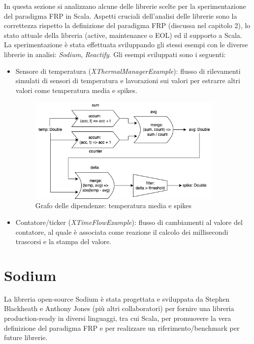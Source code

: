 \documentclass[../main.tex]{subfiles}
\begin{document}
In questa sezione si analizzano alcune delle librerie scelte per la sperimentazione del paradigma FRP in Scala. Aspetti cruciali dell'analisi delle librerie sono la correttezza rispetto la definizione del paradigma FRP (discussa nel capitolo 2), lo stato attuale della libreria (active, maintenance o EOL) ed il supporto a Scala. La sperimentazione è stata effettuata sviluppando gli stessi esempi con le diverse librerie in analisi: \textit{Sodium}, \textit{Reactify}. Gli esempi sviluppati sono i seguenti:
\begin{itemize}
    \item Sensore di temperatura (\textit{XThermalManagerExample}): flusso di rilevamenti simulati di sensori di temperatura e lavorazioni sui valori per estrarre altri valori come temperatura media e spikes.
    \begin{figure}[H]
        \centering
        \includegraphics[width=0.9\textwidth]{img/frp-scala-Page-3.drawio.png}
        \caption{Grafo delle dipendenze: temperatura media e spikes}
    \end{figure}
    \item Contatore/ticker (\textit{XTimeFlowExample}): flusso di cambiamenti al valore del contatore, al quale è associata come reazione il calcolo dei millisecondi trascorsi e la stampa del valore.
\end{itemize}

\section{Sodium}
La libreria open-source Sodium è stata progettata e sviluppata da Stephen Blackheath e Anthony Jones (più altri collaboratori) per fornire una libreria production-ready in diversi linguaggi, tra cui Scala, per promuovere la vera definizione del paradigma FRP e per realizzare un riferimento/benchmark per future librerie.
\end{document}
